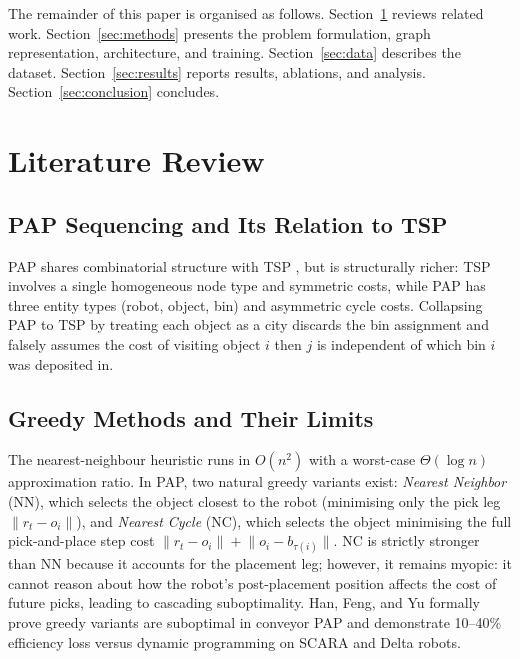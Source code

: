 \documentclass[conference]{IEEEtran}
\begin{document}
The remainder of this paper is organised as follows. Section~\ref{sec:lit} reviews related work. Section~\ref{sec:methods} presents the problem formulation, graph representation, architecture, and training. Section~\ref{sec:data} describes the dataset. Section~\ref{sec:results} reports results, ablations, and analysis. Section~\ref{sec:conclusion} concludes.

\section{Literature Review}\label{sec:lit}

\subsection{PAP Sequencing and Its Relation to TSP}

PAP shares combinatorial structure with TSP \cite{dantzig1954}, but is structurally richer: TSP involves a single homogeneous node type and symmetric costs, while PAP has three entity types (robot, object, bin) and asymmetric cycle costs. Collapsing PAP to TSP by treating each object as a city discards the bin assignment and falsely assumes the cost of visiting object $i$ then $j$ is independent of which bin $i$ was deposited in.

\subsection{Greedy Methods and Their Limits}

The nearest-neighbour heuristic \cite{rosenkrantz1977} runs in $O(n^2)$ with a worst-case $\Theta(\log n)$ approximation ratio. In PAP, two natural greedy variants exist: \emph{Nearest Neighbor} (NN), which selects the object closest to the robot (minimising only the pick leg $\lVert r_t - o_i \rVert$), and \emph{Nearest Cycle} (NC), which selects the object minimising the full pick-and-place step cost $\lVert r_t - o_i \rVert + \lVert o_i - b_{\tau(i)} \rVert$. NC is strictly stronger than NN because it accounts for the placement leg; however, it remains myopic: it cannot reason about how the robot's post-placement position affects the cost of future picks, leading to cascading suboptimality. Han, Feng, and Yu \cite{han2019pap} formally prove greedy variants are suboptimal in conveyor PAP and demonstrate 10--40\% efficiency loss versus dynamic programming on SCARA and Delta robots.
\end{document}
